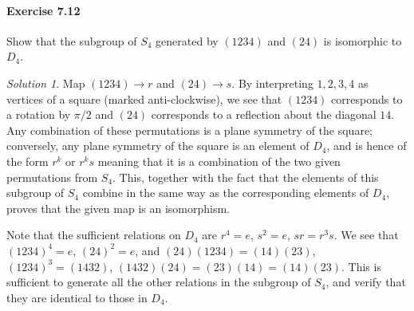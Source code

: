 \documentclass[11pt]{report}
\theoremstyle{remark}
\newtheorem*{solution}{Solution}
\begin{document}
    \paragraph{Exercise 7.12} Show that the subgroup of $S_4$ generated by $(1234)$
    and $(24)$ is isomorphic to $D_4$.
    \begin{solution}
        Map $(1234) \to r$ and $(24) \to s$. By interpreting $1, 2, 3, 4$ as
        vertices of a square (marked anti-clockwise), we see that $(1234)$
        corresponds to a rotation by $\pi / 2$ and $(24)$ corresponds to a
        reflection about the diagonal $14$. Any combination of these permutations is
        a plane symmetry of the square; conversely, any plane symmetry of the square
        is an element of $D_4$, and is hence of the form $r^k$ or $r^ks$ meaning
        that it is a combination of the two given permutations from $S_4$. This,
        together with the fact that the elements of this subgroup of $S_4$ combine
        in the same way as the corresponding elements of $D_4$, proves that the
        given map is an isomorphism.


        Note that the sufficient relations on $D_4$ are $r^4 = e$, $s^2 = e$, $sr =
        r^3s$. We see that $(1234)^4 = e$, $(24)^2 = e$, and $(24)(1234) =
        (14)(23)$, $(1234)^3 = (1432)$, $(1432)(24) = (23)(14) = (14)(23)$. This is
        sufficient to generate all the other relations in the subgroup of $S_4$, and
        verify that they are identical to those in $D_4$.
    \end{solution}
    
\end{document}
